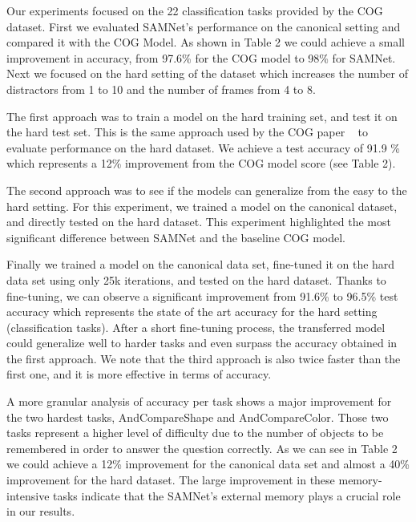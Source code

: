 Our experiments focused on the 22 classification tasks provided by the COG dataset.  First we evaluated SAMNet's performance on the canonical setting and compared it with the COG Model. As shown in Table 2 we could achieve a small improvement in accuracy, from 97.6\% for the COG model to 98\% for SAMNet. Next we focused on the hard setting of the dataset which increases the number of distractors from 1 to 10 and the number of frames from 4 to 8.

The first approach was to train a model on the hard training set, and test it on the hard test set. This is the same approach used by the COG paper ~\cite{yang2018dataset} to evaluate performance on the hard dataset. We achieve a test accuracy of 91.9 \% which represents a 12\% improvement from the COG model score (see Table 2).

The second approach was to see if the models can generalize from the easy to the hard setting. For this experiment, we trained a model on the canonical dataset, and directly tested on the hard dataset.  This experiment highlighted the most significant difference between SAMNet and the baseline COG model.

Finally we trained a model on the canonical data set, fine-tuned it on the hard data set using only 25k iterations, and tested on the hard dataset. Thanks to fine-tuning, we can observe a significant improvement from 91.6\%  to 96.5\% test accuracy which represents the state of the art accuracy for the hard setting (classification tasks).
After a short fine-tuning process, the transferred model could generalize well to harder tasks and even surpass the accuracy obtained in the first approach. We note that the third approach is also twice faster than the first one, and it is more effective in terms of accuracy.

A more granular analysis of accuracy per task shows a major improvement for the two hardest tasks, AndCompareShape and AndCompareColor. Those two tasks represent a higher level of difficulty due to the number of objects to be remembered in order to answer the question correctly.
As we can see in Table 2 we could achieve a 12\% improvement for the canonical data set and almost a 40\% improvement for the hard dataset.
The large improvement in these memory-intensive tasks indicate that the SAMNet's external memory plays a crucial role in our results.





